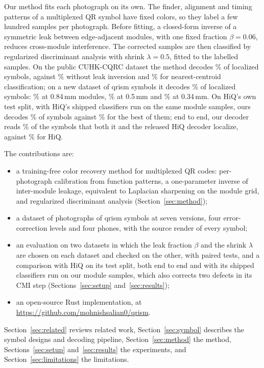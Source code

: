 Our method fits each photograph on its own. The finder, alignment and timing patterns of a
multiplexed QR symbol have fixed colors, so they label a few hundred samples per photograph.
Before fitting, a closed-form inverse of a symmetric leak between edge-adjacent modules,
with one fixed fraction $\beta=0.06$, reduces cross-module interference. The corrected
samples are then classified by regularized discriminant analysis with shrink
$\lambda=0.5$, fitted to the labelled samples. On the public CUHK-CQRC dataset the method
decodes \HiqCodeChosen\% of localized symbols, against \HiqCodeRda\% without leak inversion
and \HiqCodeEuclid\% for nearest-centroid classification; on a new dataset of qrism symbols
it decodes \QrCodeChosen\% of localized symbols: \QrCodeChosenPxTwenty\% at 0.84\,mm
modules, \QrCodeChosenPxTwelve\% at 0.5\,mm and \QrCodeChosenPxEight\% at 0.34\,mm. On HiQ's own test split, with HiQ's shipped classifiers run on the
same module samples, ours decodes \PortOursCode\% of symbols against \PortCmiCode\% for the
best of them; end to end, our decoder reads \PairCommonOurs\% of the symbols that both it and
the released HiQ decoder localize, against \PairCommonHiq\% for HiQ.

The contributions are:
\begin{itemize}
\item a training-free color recovery method for multiplexed QR codes: per-photograph
calibration from function patterns, a one-parameter inverse of inter-module leakage,
equivalent to Laplacian sharpening on the module grid, and
regularized discriminant analysis (Section~\ref{sec:method});
\item a dataset of \QrAttempted{} photographs of qrism symbols at seven versions, four
error-correction levels and four phones, with the source render of every symbol;
\item an evaluation on two datasets in which the leak fraction $\beta$ and the shrink $\lambda$ are chosen on each dataset and
checked on the other, with paired tests, and a comparison with HiQ on its test split, both
end to end and with its shipped classifiers run on our module samples, which also corrects
two defects in its CMI step (Sections~\ref{sec:setup} and~\ref{sec:results});
\item an open-source Rust implementation, at \url{https://github.com/mohnishsalian0/qrism}.
\end{itemize}

Section~\ref{sec:related} reviews related work, Section~\ref{sec:symbol} describes the
symbol designs and decoding pipeline, Section~\ref{sec:method} the method,
Sections~\ref{sec:setup} and~\ref{sec:results} the experiments, and
Section~\ref{sec:limitations} the limitations.
